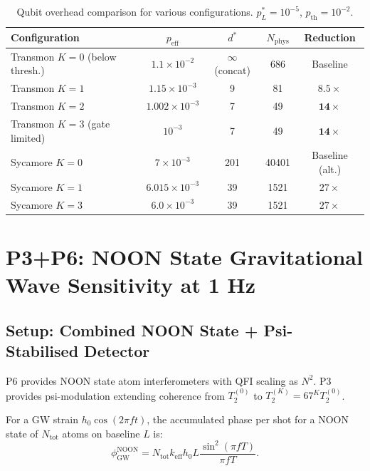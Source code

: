 \documentclass[11pt]{article}
\theoremstyle{definition}
\theoremstyle{remark}
\begin{document}
\begin{table}[h]
\centering
\caption{Qubit overhead comparison for various configurations.
  $p_L^* = 10^{-5}$, $p_{\mathrm{th}} = 10^{-2}$.}
\label{tab:qubit-overhead}
\begin{tabular}{@{}lcccc@{}}
\toprule
Configuration & $p_{\mathrm{eff}}$ & $d^*$ & $N_{\mathrm{phys}}$ & Reduction \\
\midrule
Transmon $K=0$ (below thresh.) & $1.1\times10^{-2}$ & $\infty$ (concat) & 686 & Baseline \\
Transmon $K=1$ & $1.15\times10^{-3}$ & 9 & 81 & $\mathbf{8.5\times}$ \\
Transmon $K=2$ & $1.002\times10^{-3}$ & 7 & 49 & $\mathbf{14\times}$ \\
Transmon $K=3$ (gate limited) & $10^{-3}$ & 7 & 49 & $\mathbf{14\times}$ \\
Sycamore $K=0$ & $7\times10^{-3}$ & 201 & 40401 & Baseline (alt.) \\
Sycamore $K=1$ & $6.015\times10^{-3}$ & 39 & 1521 & $27\times$ \\
Sycamore $K=3$ & $6.0\times10^{-3}$ & 39 & 1521 & $27\times$ \\
\bottomrule
\end{tabular}
\end{table}

\section{P3+P6: NOON State Gravitational Wave Sensitivity at 1 Hz}
\label{sec:p3p6-gw}

\subsection{Setup: Combined NOON State + Psi-Stabilised Detector}

P6 provides NOON state atom interferometers with QFI scaling as $N^2$.
P3 provides psi-modulation extending coherence from $T_2^{(0)}$ to
$T_2^{(K)} = 67^K T_2^{(0)}$.

For a GW strain $h_0\cos(2\pi ft)$, the accumulated phase per shot
for a NOON state of $N_{\mathrm{tot}}$ atoms on baseline $L$ is:
\begin{equation}
  \phi_{\mathrm{GW}}^{\mathrm{NOON}} = N_{\mathrm{tot}} k_{\mathrm{eff}} h_0 L
  \frac{\sin^2(\pi fT)}{\pi fT}. \label{eq:noon-gw-phase}
\end{equation}
\end{document}
